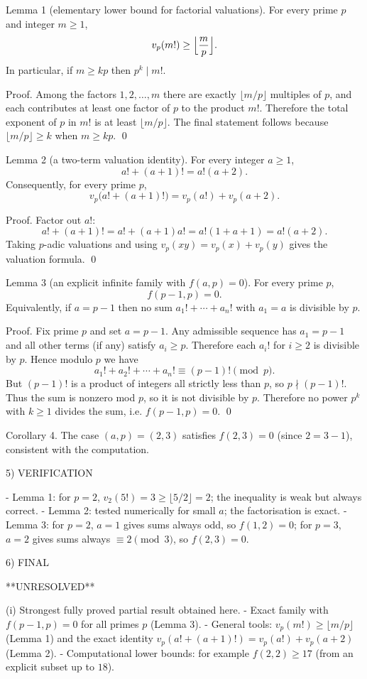 Lemma 1 (elementary lower bound for factorial valuations).
For every prime $p$ and integer $m\ge 1$,
\[
 v_p(m!)\ge \Bigl\lfloor\frac{m}{p}\Bigr\rfloor.
\]
In particular, if $m\ge kp$ then $p^k\mid m!$.

Proof.
Among the factors $1,2,\dots,m$ there are exactly $\lfloor m/p\rfloor$ multiples of $p$, and each contributes at least one factor of $p$ to the product $m!$. Therefore the total exponent of $p$ in $m!$ is at least $\lfloor m/p\rfloor$. The final statement follows because $\lfloor m/p\rfloor\ge k$ when $m\ge kp$. \qed

Lemma 2 (a two-term valuation identity).
For every integer $a\ge 1$,
\[
 a!+(a+1)! = a!(a+2).
\]
Consequently, for every prime $p$,
\[
 v_p\bigl(a!+(a+1)!\bigr)=v_p(a!)+v_p(a+2).
\]

Proof.
Factor out $a!$:
\[
 a!+(a+1)! = a! + (a+1)a! = a!(1+a+1)=a!(a+2).
\]
Taking $p$-adic valuations and using $v_p(xy)=v_p(x)+v_p(y)$ gives the valuation formula. \qed

Lemma 3 (an explicit infinite family with $f(a,p)=0$).
For every prime $p$,
\[
 f(p-1,p)=0.
\]
Equivalently, if $a=p-1$ then no sum $a_1!+\cdots+a_n!$ with $a_1=a$ is divisible by $p$.

Proof.
Fix prime $p$ and set $a=p-1$.
Any admissible sequence has $a_1=p-1$ and all other terms (if any) satisfy $a_i\ge p$. Therefore each $a_i!$ for $i\ge 2$ is divisible by $p$. Hence modulo $p$ we have
\[
 a_1!+a_2!+\cdots+a_n! \equiv (p-1)! \pmod p.
\]
But $(p-1)!$ is a product of integers all strictly less than $p$, so $p\nmid (p-1)!$. Thus the sum is nonzero mod $p$, so it is not divisible by $p$. Therefore no power $p^k$ with $k\ge 1$ divides the sum, i.e. $f(p-1,p)=0$. \qed

Corollary 4.
The case $(a,p)=(2,3)$ satisfies $f(2,3)=0$ (since $2=3-1$), consistent with the computation.

5) VERIFICATION

- Lemma 1: for $p=2$, $v_2(5!)=3\ge\lfloor 5/2\rfloor=2$; the inequality is weak but always correct.
- Lemma 2: tested numerically for small $a$; the factorisation is exact.
- Lemma 3: for $p=2$, $a=1$ gives sums always odd, so $f(1,2)=0$; for $p=3$, $a=2$ gives sums always $\equiv 2\pmod 3$, so $f(2,3)=0$.

6) FINAL

**UNRESOLVED**

(i) Strongest fully proved partial result obtained here.
- Exact family with $f(p-1,p)=0$ for all primes $p$ (Lemma 3).
- General tools: $v_p(m!)\ge\lfloor m/p\rfloor$ (Lemma 1) and the exact identity $v_p(a!+(a+1)!)=v_p(a!)+v_p(a+2)$ (Lemma 2).
- Computational lower bounds: for example $f(2,2)\ge 17$ (from an explicit subset up to $18$).

